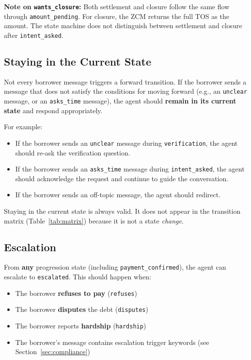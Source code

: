 \documentclass[11pt, a4paper]{article}
\begin{document}
\textbf{Note on \texttt{wants\_closure}:} Both settlement and closure follow the same flow through \texttt{amount\_pending}. For closure, the ZCM returns the full TOS as the amount. The state machine does not distinguish between settlement and closure after \texttt{intent\_asked}.

\subsection{Staying in the Current State}

Not every borrower message triggers a forward transition. If the borrower sends a message that does not satisfy the conditions for moving forward (e.g., an \texttt{unclear} message, or an \texttt{asks\_time} message), the agent should \textbf{remain in its current state} and respond appropriately.

For example:
\begin{itemize}[nosep]
  \item If the borrower sends an \texttt{unclear} message during \texttt{verification}, the agent should re-ask the verification question.
  \item If the borrower sends an \texttt{asks\_time} message during \texttt{intent\_asked}, the agent should acknowledge the request and continue to guide the conversation.
  \item If the borrower sends an off-topic message, the agent should redirect.
\end{itemize}

Staying in the current state is always valid. It does not appear in the transition matrix (Table~\ref{tab:matrix}) because it is not a state \textit{change}.

\subsection{Escalation}

From \textbf{any} progression state (including \texttt{payment\_confirmed}), the agent can escalate to \texttt{escalated}. This should happen when:

\begin{itemize}[nosep]
  \item The borrower \textbf{refuses to pay} (\texttt{refuses})
  \item The borrower \textbf{disputes} the debt (\texttt{disputes})
  \item The borrower reports \textbf{hardship} (\texttt{hardship})
  \item The borrower's message contains escalation trigger keywords (see Section~\ref{sec:compliance})
\end{itemize}
\end{document}
